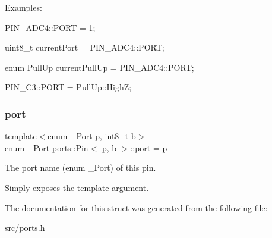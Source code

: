 Examples\+:


\begin{DoxyItemize}
\item {\ttfamily P\+I\+N\+\_\+\+A\+D\+C4\+::\+P\+O\+RT = 1;}
\item {\ttfamily uint8\+\_\+t current\+Port = P\+I\+N\+\_\+\+A\+D\+C4\+::\+P\+O\+RT;}
\item {\ttfamily enum Pull\+Up current\+Pull\+Up = P\+I\+N\+\_\+\+A\+D\+C4\+::\+P\+O\+RT;}
\item {\ttfamily P\+I\+N\+\_\+\+C3\+::\+P\+O\+RT = Pull\+Up\+::\+HighZ;} 
\end{DoxyItemize}\hypertarget{structports_1_1Pin_ad63613b8c14441d28e3f3d935da67e77}{}\label{structports_1_1Pin_ad63613b8c14441d28e3f3d935da67e77} 
\subsubsection{\texorpdfstring{port}{port}}
{\footnotesize\ttfamily template$<$enum \+\_\+\+Port p, int8\+\_\+t b$>$ \\
enum \hyperlink{namespaceports_a9949317f344930bd6ad1097e80c97b67}{\+\_\+\+Port} \hyperlink{structports_1_1Pin}{ports\+::\+Pin}$<$ p, b $>$\+::port = p\hspace{0.3cm}{\ttfamily [static]}}



The port name (enum \+\_\+\+Port) of this pin. 

Simply exposes the template argument. 

The documentation for this struct was generated from the following file\+:\begin{DoxyCompactItemize}
\item 
src/ports.\+h\end{DoxyCompactItemize}
